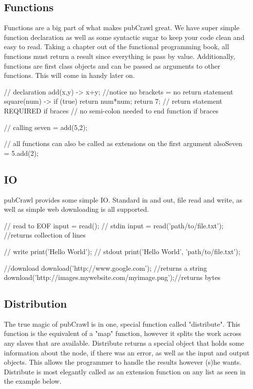 \documentclass[letterpaper]{article}
\begin{document}
\subsection{Functions}
Functions are a big part of what makes pubCrawl great. We have super simple function declaration as well as some syntactic sugar to keep your code clean and easy to read. Taking a chapter out of the functional programming book, all functions must return a result since everything is pass by value. Additionally, functions are first class objects and can be passed as arguments to other functions. This will come in handy later on.

\begin{mdframed}[hidealllines=true,backgroundcolor=gray!10,skipbelow=1em,skipabove=.5em]
\begin{code}
// declaration
add(x,y) -> x+y; //notice no brackets = no return statement
square(num) -> {
	if (true) {
		return num*num;
	}
	return 7; // return statement REQUIRED if braces
} // no semi-colon needed to end function if braces

// calling
seven = add(5,2);

// all functions can also be called as extensions on the first argument
alsoSeven = 5.add(2);
\end{code}
\end{mdframed}
\subsection{IO}
pubCrawl provides some simple IO. Standard in and out, file read and write, as well as simple web downloading is all supported. 

\begin{mdframed}[hidealllines=true,backgroundcolor=gray!10,skipbelow=1em,skipabove=.5em]
\begin{code}
// read to EOF
input = read(); // stdin
input = read('path/to/file.txt'); //returns collection of lines

// write
print('Hello World'); // stdout
print('Hello World', 'path/to/file.txt');

//download
download('http://www.google.com'); //returns a string
download('http://images.mywebsite.com/myimage.png');//returns bytes
\end{code}
\end{mdframed}

\subsection{Distribution}
The true magic of pubCrawl is in one, special function called "distribute". This function is the equivalent of a "map" function, however it splits the work across any slaves that are available. Distribute returns a special object that holds some information about the node, if there was an error, as well as the input and output objects. This allows the programmer to handle the results however (s)he wants. Distribute is most elegantly called as an extension function on any list as seen in the example below.\\[6em]
\end{document}

